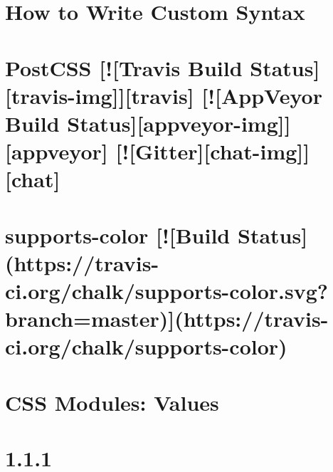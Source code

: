 \documentclass[twoside]{book}
\newcommand{\+}{\discretionary{\mbox{\scriptsize$\hookleftarrow$}}{}{}}
\begin{document}
\chapter{How to Write Custom Syntax}
\label{md__c_1_workspace_demo_src_main_script_node_modules_postcss-modules-values_node_modules_postcss_docs_syntax}

\chapter{Post\+C\+SS \mbox{[}!\mbox{[}Travis Build Status\mbox{]}\mbox{[}travis-\/img\mbox{]}\mbox{]}\mbox{[}travis\mbox{]} \mbox{[}!\mbox{[}App\+Veyor Build Status\mbox{]}\mbox{[}appveyor-\/img\mbox{]}\mbox{]}\mbox{[}appveyor\mbox{]} \mbox{[}!\mbox{[}Gitter\mbox{]}\mbox{[}chat-\/img\mbox{]}\mbox{]}\mbox{[}chat\mbox{]}}
\label{md__c_1_workspace_demo_src_main_script_node_modules_postcss-modules-values_node_modules_postcss__r_e_a_d_m_e}

\chapter{supports-\/color \mbox{[}!\mbox{[}Build Status\mbox{]}(https\+://travis-\/ci.org/chalk/supports-\/color.svg?branch=master)\mbox{]}(https\+://travis-\/ci.org/chalk/supports-\/color)}
\label{md__c_1_workspace_demo_src_main_script_node_modules_postcss-modules-values_node_modules_supports-color_readme}

\chapter{C\+SS Modules\+: Values}
\label{md__c_1_workspace_demo_src_main_script_node_modules_postcss-modules-values__r_e_a_d_m_e}

\chapter{1.1.1}
\label{md__c_1_workspace_demo_src_main_script_node_modules_postcss-normalize-charset__c_h_a_n_g_e_l_o_g}

\end{document}

